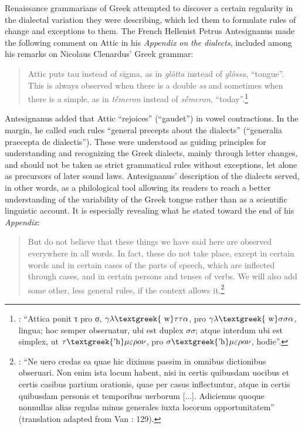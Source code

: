 Renaissance grammarians of Greek attempted to discover a certain regularity in the dialectal variation they were describing, which led them to formulate rules of change and exceptions to them. The French Hellenist Petrus Antesignanus made the following comment on Attic in his \textit{Appendix} \textit{on} \textit{the} \textit{dialects}, included among his remarks on Nicolaus Clenardus’ Greek grammar:

\begin{quote}
Attic puts tau instead of sigma, as in \textit{glôtta} instead of \textit{glôssa}, “tongue”. This is always observed when there is a double \textit{ss} and sometimes when there is a simple, as in \textit{tḗmeron} instead of \textit{sḗmeron}, “today”.\footnote{ \textrm{\citet[13]{Antesignanus1554}: “Attica ponit τ pro σ, $\gamma \lambda \text{\textgreek{~w}}\tau \tau \alpha $, pro $\gamma \lambda \text{\textgreek{~w}}\sigma \sigma \alpha $, lingua; hoc semper obseruatur, ubi est duplex $\sigma \sigma $; atque interdum ubi est simplex, ut $\tau \text{\textgreek{'h}}\mu \varepsilon \rho o\nu $, pro $\sigma \text{\textgreek{'h}}\mu \varepsilon \rho o\nu $, hodie”.}}
\end{quote}

Antesignanus added that Attic “rejoices” (“gaudet”) in vowel contractions. In the margin, he called such rules “general precepts about the dialects” (“generalia praecepta de dialectis”). These were understood as guiding principles for understanding and recognizing the Greek dialects, mainly through letter changes, and should not be taken as strict grammatical rules without exceptions, let alone as precursors of later sound laws. Antesignanus’ description of the dialects served, in other words, as a philological tool allowing its readers to reach a better understanding of the variability of the Greek tongue rather than as a scientific linguistic account. It is especially revealing what he stated toward the end of his \textit{Appendix}:

\begin{quote}
But do not believe that these things we have said here are observed everywhere in all words. In fact, these do not take place, except in certain words and in certain cases of the parts of speech, which are inflected through cases, and in certain persons and tenses of verbs. We will also add some other, less general rules, if the context allows it.\footnote{ \textrm{\citet[15]{Antesignanus1554}: “Ne uero credas ea quae hic diximus passim in omnibus dictionibus obseruari. Non enim ista locum habent, nisi in certis quibusdam uocibus et certis casibus partium orationis, quae per casus inflectuntur, atque in certis quibusdam personis et temporibus uerborum [...]. Adiciemus quoque nonnullas alias regulas minus generales iuxta locorum opportunitatem” (translation adapted from Van \citealt{Rooy2016c}: 129).}}
\end{quote}

